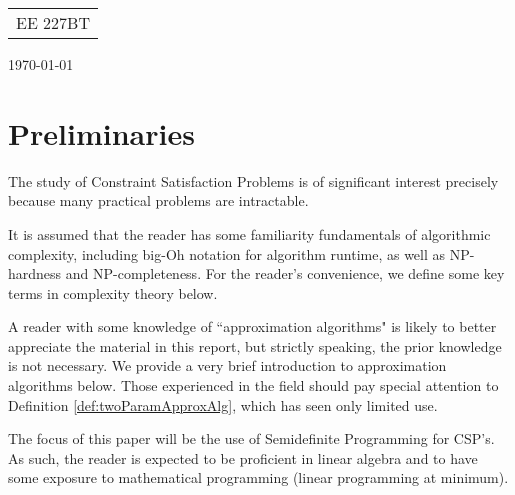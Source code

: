 %

{\parindent 0pt \begin{tabular}[t]{l}
EE 227BT \\
\end{tabular}  \hfill \today \vskip 0.2in }

\parindent 0pt
\parskip 8pt

\section*{Preliminaries}

The study of Constraint Satisfaction Problems is of significant interest precisely because many practical problems are intractable.  

It is assumed that the reader has some familiarity fundamentals of algorithmic complexity, including big-Oh notation for algorithm runtime, as well as NP-hardness and NP-completeness. 
For the reader's convenience, we define some key terms in complexity theory below.

A reader with some knowledge of ``approximation algorithms" is likely to better appreciate the material in this report, but strictly speaking, the prior knowledge is not necessary. 
We provide a very brief introduction to approximation algorithms below. 
Those experienced in the field should pay special attention to Definition \ref{def:twoParamApproxAlg}, which has seen only limited use.

The focus of this paper will be the use of Semidefinite Programming for CSP's. As such, the reader is expected to be proficient in linear algebra and to have some exposure to mathematical programming (linear programming at minimum).

